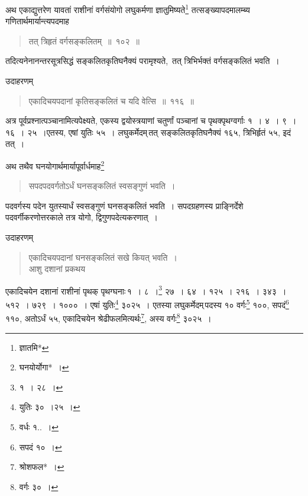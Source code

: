 \documentclass[10pt, openany]{book}
\begin{document}
{{{{{{{{{{{{{{{अथ एकाद्युत्तरेण यावतां राशीनां वर्गसंयोगो लघुकर्मणा
ज्ञातुमिष्यते\renewcommand{\thefootnote}{७}\footnote{ज्ञातमि*} तत्सङ्ख्यापदमालम्ब्य गणितार्थमार्यान्त्यपदमाह\textemdash}

 \label{102}
\begin{quote}
    
\hspace{20mm} {\bs  तत् त्रिहृतं वर्गसङ्कलितम्~॥~१०२~॥}\end{quote}

{तदित्यनेनानन्तरसूत्रसिद्धं \;सङ्कलितकृतिघनैक्यं \;परामृश्यते, \,तत् \;त्रिभिर्भक्तं \;वर्गसङ्कलितं}
{भवति~।}
\vspace{3mm}

{उदाहरणम्\textendash}

\begin{quote}
    
 {\eg  एकादिचयपदानां कृतिसङ्कलितं च यदि वेत्सि~॥~११६~॥}\end{quote}

{अत्र पूर्वप्रश्नात्पञ्चानामित्यपेक्ष्यते, एकस्य द्वयोस्त्रयाणां
चतुर्णां पञ्चानां च पृथक्पृथग्वर्गाः १~। ४~। ९~। १६~। २५~।एतस्य, एषां युतिः ५५~। लघुकर्मेदम्\textendash \,तत् सङ्कलितकृतिघनैक्यं १६५, त्रिभिर्हृतं ५५, इदं तत्~।}
\vspace{3mm}

{अथ तथैव घनयोगार्थमार्यापूर्वार्धमाह\renewcommand{\thefootnote}{८}\footnote{घनयोर्योगा*~।}\textendash}

\begin{quote}
    
{\bs सपदपदवर्गतोऽर्धं घनसङ्कलितं स्वसङ्गुणं भवति~।}\end{quote}

{पदवर्गस्य पदेन युतस्यार्धं स्वसङ्गुणं घनसङ्कलितं भवति~। सपदग्रहणस्य
प्राङ्निर्देशे}
{पदवर्गीकरणोत्तरकाले तत्र योगो, द्विगुणपदेत्यकरणात्~।}

\newpage

{उदाहरणम्\textemdash}

\begin{quote}
 {\eg एकादिचयपदानां घनसङ्कलितं सखे कियत् भवति~। \\
 आशु दशानां प्रकथय}
\end{quote}

{एकादिचयेन दशानां राशीनां पृथक् पृथग्घनाः\textendash \,१~। ८~।\renewcommand{\thefootnote}{१}\footnote{१~। २८~।} २७~। ६४~। १२५~।}
{२१६~। ३४३~। ५१२~। ७२९~। १०००~। एषां युतिः\renewcommand{\thefootnote}{२}\footnote{युतिः ३०~।२५~।}  ३०२५~। एतस्या
लघुकर्मेदम्\textendash \,पदस्य १०}
{वर्गः\renewcommand{\thefootnote}{३}\footnote{वर्धः १..~।}  १००, सपदं\renewcommand{\thefootnote}{४}\footnote{सपदं १०~।}  ११०, अतोऽर्धं ५५, एकादिचयेन
श्रेढीफलमित्यर्थः\renewcommand{\thefootnote}{५}\footnote{श्रोशफल*~।}, अस्य वर्गः\renewcommand{\thefootnote}{६}\footnote{वर्गः ३०~।}  ३०२५~।}
\vspace{3mm}

}}}}}}}}}}}}}}
\end{document}
